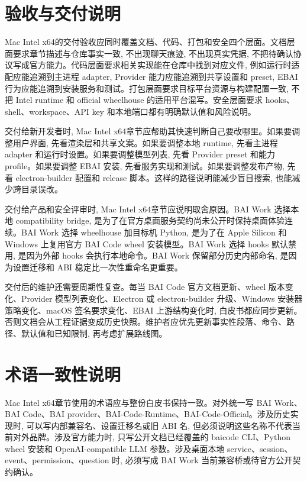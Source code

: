 \section{验收与交付说明}
Mac Intel x64的交付验收应同时覆盖文档、代码、打包和安全四个层面。文档层面要求章节描述与仓库事实一致, 不出现聊天痕迹, 不出现真实凭据, 不把待确认协议写成官方能力。代码层面要求相关实现能在仓库中找到对应文件, 例如运行时适配应能追溯到主进程 adapter, Provider 能力应能追溯到共享设置和 preset, EBAI 行为应能追溯到安装服务和测试。打包层面要求目标平台资源与构建配置一致, 不把 Intel runtime 和 official wheelhouse 的适用平台混写。安全层面要求 hooks、shell、workspace、API key 和本地端口都有明确默认值和风险说明。

交付给新开发者时, Mac Intel x64章节应帮助其快速判断自己要改哪里。如果要调整用户界面, 先看渲染层和共享文案。如果要调整本地 runtime, 先看主进程 adapter 和运行时设置。如果要调整模型列表, 先看 Provider preset 和能力 profile。如果要调整 EBAI 安装, 先看服务实现和测试。如果要调整发布产物, 先看 electron-builder 配置和 release 脚本。这样的路径说明能减少盲目搜索, 也能减少跨目录误改。

交付给产品和安全评审时, Mac Intel x64章节应说明取舍原因。BAI Work 选择本地 compatibility bridge, 是为了在官方桌面服务契约尚未公开时保持桌面体验连续。BAI Work 选择 wheelhouse 加目标机 Python, 是为了在 Apple Silicon 和 Windows 上复用官方 BAI Code wheel 安装模型。BAI Work 选择 hooks 默认禁用, 是因为外部 hooks 会执行本地命令。BAI Work 保留部分历史内部命名, 是因为设置迁移和 ABI 稳定比一次性重命名更重要。

交付后的维护还需要周期性复查。每当 BAI Code 官方文档更新、wheel 版本变化、Provider 模型列表变化、Electron 或 electron-builder 升级、Windows 安装器策略变化、macOS 签名要求变化、EBAI 上游结构变化时, 白皮书都应同步更新。否则文档会从工程证据变成历史快照。维护者应优先更新事实性段落、命令、路径、默认值和已知限制, 再考虑扩展路线图。

\section{术语一致性说明}
Mac Intel x64章节使用的术语应与整份白皮书保持一致。对外统一写 BAI Work、BAI Code、BAI provider、BAI-Code-Runtime、BAI-Code-Official。涉及历史实现时, 可以写内部兼容名、设置迁移名或旧 ABI 名, 但必须说明这些名称不代表当前对外品牌。涉及官方能力时, 只写公开文档已经覆盖的 baicode CLI、Python wheel 安装和 OpenAI-compatible LLM 参数。涉及桌面本地 service、session、event、permission、question 时, 必须写成 BAI Work 当前兼容桥或待官方公开契约确认。


